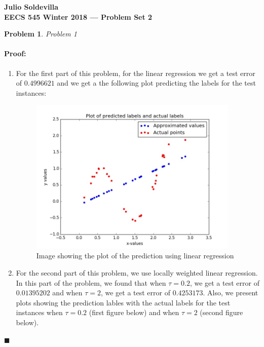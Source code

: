\documentclass[12pt]{article}
\newenvironment{proof}{\paragraph{Proof: }}{\hfill$\blacksquare$}
\newtheorem{problem}{Problem}%
\begin{document}
\begin{center}
{\bf Julio Soldevilla}
\\
{\bf EECS 545 Winter 2018 --- Problem Set 2 }
\end{center}

\begin{problem}
\normalfont
Problem 1
\end{problem}

\begin{proof}
\begin{enumerate}
\item For the first part of this problem, for the linear regression we get a test error of $0.4996621$ and we get a the following plot predicting the labels for the test instances:

\begin{figure}[!htbp]
\centering
\includegraphics[width=10cm]{hw2_p1_linreg.jpg}
\caption{Image showing the plot of the prediction using linear regression}
\end{figure}


\item For the second part of this problem, we use locally weighted linear regression. In this part of the problem, we found that when $\tau = 0.2$, we get a test error of $0.01395202$ and when $\tau = 2$, we get a test error of $0.4253173$. Also, we present plots showing the prediction lables with the actual labels for the test instances when $\tau = 0.2$ (first figure below) and when $\tau = 2$ (second figure below).


\end{enumerate}
\end{proof}
\end{document}
